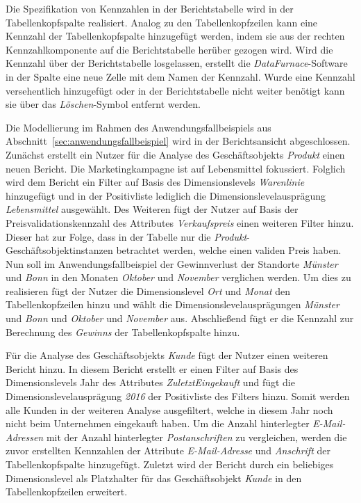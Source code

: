 \documentclass[
  language=german, %
  type=bachelor,%
  ngerman
]{isthesis}
\begin{document}
\begin{content}
  Die Spezifikation von Kennzahlen in der Berichtstabelle wird in der
  Tabellenkopfspalte realisiert. Analog zu den Tabellenkopfzeilen kann eine
  Kennzahl der Tabellenkopfspalte hinzugefügt werden, indem sie aus der rechten
  Kennzahlkomponente auf die Berichtstabelle herüber gezogen wird. Wird die
  Kennzahl über der Berichtstabelle losgelassen, erstellt die
  \textit{DataFurnace}-Software in der Spalte eine neue Zelle mit dem Namen der
  Kennzahl. Wurde eine Kennzahl versehentlich hinzugefügt oder in der
  Berichtstabelle nicht weiter benötigt kann sie über das
  \textit{Löschen}-Symbol entfernt werden.

  Die Modellierung im Rahmen des Anwendungsfallbeispiels aus
  Abschnitt~\ref{sec:anwendungsfallbeispiel} wird in der Berichtsansicht
  abgeschlossen. Zunächst erstellt ein Nutzer für die Analyse des
  Geschäftsobjekts \textit{Produkt} einen neuen Bericht. Die Marketingkampagne
  ist auf Lebensmittel fokussiert. Folglich wird dem Bericht ein Filter auf
  Basis des Dimensionslevels \textit{Warenlinie} hinzugefügt und in der
  Positivliste lediglich die Dimensionslevelausprägung \textit{Lebensmittel}
  ausgewählt. Des Weiteren fügt der Nutzer auf Basis der
  Preisvalidationskennzahl des Attributes \textit{Verkaufspreis} einen weiteren
  Filter hinzu. Dieser hat zur Folge, dass in der Tabelle nur die
  \textit{Produkt}-Geschäftsobjektinstanzen betrachtet werden, welche einen
  validen Preis haben. Nun soll im Anwendungsfallbeispiel der Gewinnverlust der
  Standorte \textit{Münster} und \textit{Bonn} in den Monaten \textit{Oktober}
  und \textit{November} verglichen werden. Um dies zu realisieren fügt der
  Nutzer die Dimensionslevel \textit{Ort} und \textit{Monat} den
  Tabellenkopfzeilen hinzu und wählt die Dimensionslevelausprägungen
  \textit{Münster} und \textit{Bonn} und \textit{Oktober} und \textit{November}
  aus. Abschließend fügt er die Kennzahl zur Berechnung des \textit{Gewinns}
  der Tabellenkopfspalte hinzu.  

  Für die Analyse des Geschäftsobjekts \textit{Kunde} fügt der Nutzer einen
  weiteren Bericht hinzu. In diesem Bericht erstellt er einen Filter auf Basis
  des Dimensionslevels Jahr des Attributes \textit{ZuletztEingekauft} und fügt
  die Dimensionslevelausprägung \textit{2016} der Positivliste des Filters
  hinzu. Somit werden alle Kunden in der weiteren Analyse ausgefiltert, welche
  in diesem Jahr noch nicht beim Unternehmen eingekauft haben. Um die Anzahl
  hinterlegter \textit{E-Mail-Adressen} mit der Anzahl hinterlegter
  \textit{Postanschriften} zu vergleichen, werden die zuvor erstellten
  Kennzahlen der Attribute \textit{E-Mail-Adresse} und \textit{Anschrift} der
  Tabellenkopfspalte hinzugefügt. Zuletzt wird der Bericht durch ein beliebiges
  Dimensionslevel als Platzhalter für das Geschäftsobjekt \textit{Kunde} in den
  Tabellenkopfzeilen erweitert.



\end{content}
\end{document}
